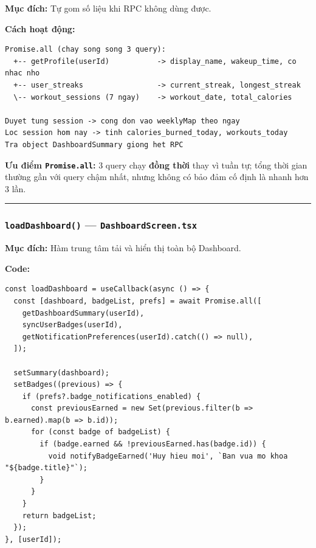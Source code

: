 \documentclass[12pt,a4paper]{article}
\providecommand{\passthrough}[1]{#1}
\begin{document}
\textbf{Mục đích:} Tự gom số liệu khi RPC không dùng được.

\textbf{Cách hoạt động:}

\begin{lstlisting}
Promise.all (chay song song 3 query):
  +-- getProfile(userId)           -> display_name, wakeup_time, co nhac nho
  +-- user_streaks                 -> current_streak, longest_streak
  \-- workout_sessions (7 ngay)    -> workout_date, total_calories

Duyet tung session -> cong don vao weeklyMap theo ngay
Loc session hom nay -> tinh calories_burned_today, workouts_today
Tra object DashboardSummary giong het RPC
\end{lstlisting}

\textbf{Ưu điểm \passthrough{\lstinline!Promise.all!}:} 3 query chạy
\textbf{đồng thời} thay vì tuần tự; tổng thời gian thường gần với query
chậm nhất, nhưng không có bảo đảm cố định là nhanh hơn 3 lần.

\begin{center}\rule{0.5\linewidth}{0.5pt}\end{center}

\subsubsection{\texorpdfstring{\texttt{loadDashboard()} ---
\texttt{DashboardScreen.tsx}}{loadDashboard() --- DashboardScreen.tsx}}\label{loaddashboard-dashboardscreen.tsx}

\textbf{Mục đích:} Hàm trung tâm tải và hiển thị toàn bộ Dashboard.

\textbf{Code:}

\begin{lstlisting}
const loadDashboard = useCallback(async () => {
  const [dashboard, badgeList, prefs] = await Promise.all([
    getDashboardSummary(userId),
    syncUserBadges(userId),
    getNotificationPreferences(userId).catch(() => null),
  ]);

  setSummary(dashboard);
  setBadges((previous) => {
    if (prefs?.badge_notifications_enabled) {
      const previousEarned = new Set(previous.filter(b => b.earned).map(b => b.id));
      for (const badge of badgeList) {
        if (badge.earned && !previousEarned.has(badge.id)) {
          void notifyBadgeEarned('Huy hieu moi', `Ban vua mo khoa "${badge.title}"`);
        }
      }
    }
    return badgeList;
  });
}, [userId]);

\end{lstlisting}
\end{document}
